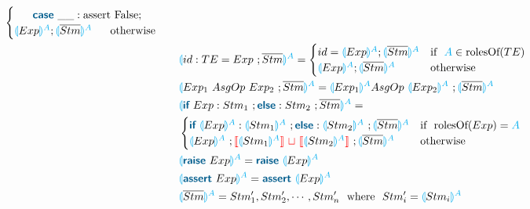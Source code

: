 \documentclass{thesis}
\newcommand{\projection}[2]{{\color{cyan}\llparenthesis}#1{\color{cyan}\rrparenthesis^#2}}
\newcommand{\mblue}[1]{\textbf{\textsf{\color{MidnightBlue}#1}}}
\newcommand{\cyan}[1]{\color{cyan}#1}
\newcommand{\nl}[1]{{\color{red}{\llbracket}}#1{\color{red}{\rrbracket}}} %
\newcommand{\mg}{~{\color{red}{\sqcup}}~} %
\begin{document}
\begin{alignat*}{2}
\begin{cases}
    ~~~~~\mblue{case} ~\_\_: \text{assert False}; \\
    \projection{Exp}{A};\projection{\overline{Stm}}{A} ~~~~~ \text{otherwise}\\
  \end{cases}\\
  &&& \projection{id:TE = Exp~;\overline{Stm}}{A} =
  \begin{cases}
    id = \projection{Exp}{A};\projection{\overline{Stm}}{A} & \text{if}~~ {\color{cyan}A} \in \text{rolesOf}(TE)\\
    \projection{Exp}{A};\projection{\overline{Stm}}{A} & \text{otherwise}
  \end{cases}\\
  &&& \projection{Exp_1 ~AsgOp~ Exp_2 ~; \overline{Stm}}{A} = \projection{Exp_1}{A} AsgOp~ \projection{Exp_2}{A} ~; \projection{\overline{Stm}}{A} \\
  &&&\projection{\mblue{if}~Exp:Stm_1~;\mblue{else}:Stm_2 ~;\overline{Stm}}{A}=\\
  &&&
  \begin{cases}
    \mblue{if}~\projection{Exp}{A} : \projection{Stm_1}{A} ~; \mblue{else}:\projection{Stm_2}{A} ~;\projection{\overline{Stm}}{A} & \text{if}~~ \text{rolesOf}(Exp) = \cyan{A}\\
    \projection{Exp}{A} ~; \nl{\projection{Stm_1}{A}} \mg \nl{\projection{Stm_2}{A}} ~;\projection{\overline{Stm}}{A} & \text{otherwise}
  \end{cases}\\
  &&&\projection{\mblue{raise}~Exp}{A} = \mblue{raise}~\projection{Exp}{A}\\
  &&&\projection{\mblue{assert}~Exp}{A} = \mblue{assert}~\projection{Exp}{A}\\
  &&&\projection{\overline{Stm}}{A} = Stm'_1,Stm'_2,\cdots,Stm'_n ~~\text{where}~~ Stm'_i = \projection{Stm_i}{A}\\  
\end{alignat*}
\end{document}
